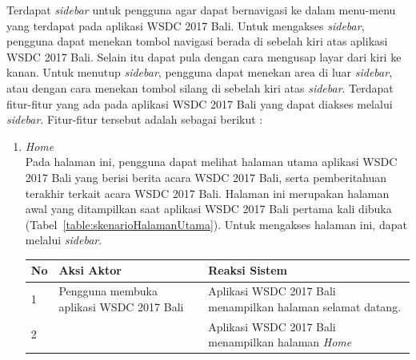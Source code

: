 Terdapat {\it sidebar} untuk pengguna agar dapat bernavigasi ke dalam menu-menu yang terdapat pada aplikasi WSDC 2017 Bali. Untuk mengakses {\it sidebar}, pengguna dapat menekan tombol navigasi berada di sebelah kiri atas aplikasi WSDC 2017 Bali. Selain itu dapat pula dengan cara mengusap layar dari kiri ke kanan. Untuk menutup {\it sidebar}, pengguna dapat menekan area di luar {\it sidebar}, atau dengan cara menekan tombol silang di sebelah kiri atas {\it sidebar}. Terdapat fitur-fitur yang ada pada aplikasi WSDC 2017 Bali yang dapat diakses melalui {\it sidebar}. Fitur-fitur tersebut adalah sebagai berikut :
\begin{enumerate}
	\item \textit{Home} \\
	Pada halaman ini, pengguna dapat melihat halaman utama aplikasi WSDC 2017 Bali yang berisi berita acara WSDC 2017 Bali, serta pemberitahuan terakhir terkait acara WSDC 2017 Bali. Halaman ini merupakan halaman awal yang ditampilkan saat aplikasi WSDC 2017 Bali pertama kali dibuka (Tabel~\ref{table:skenarioHalamanUtama}). Untuk mengakses halaman ini, dapat melalui \textit{sidebar}.
		\begin{table}[H]
			\centering
			\begin{tabular}{|p{0.5cm}|p{7cm}|p{7cm}|}
				\hline
				No & Aksi Aktor                               & Reaksi Sistem                                          \\ \hline
				1  & Pengguna membuka aplikasi WSDC 2017 Bali & Aplikasi WSDC 2017 Bali menampilkan halaman selamat datang. \\ \hline
				2  &                                          & Aplikasi WSDC 2017 Bali menampilkan halaman \textit{Home}           \\ \hline

\end{tabular}
\end{table}
\end{enumerate}
